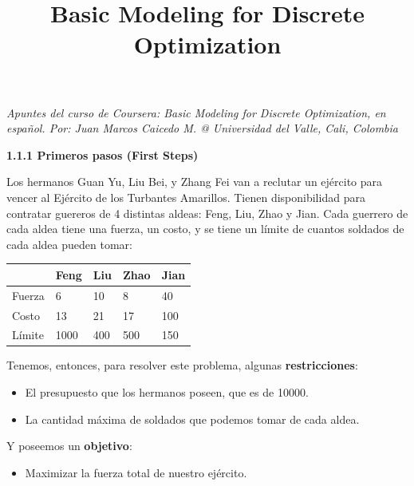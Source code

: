 \documentclass[12pt]{article}
\begin{document}
\title{\textbf{Basic Modeling for Discrete Optimization}}
\date{}
\maketitle

\textit{Apuntes del curso de Coursera: Basic Modeling for Discrete Optimization, en español. Por: Juan Marcos Caicedo M. @ Universidad del Valle, Cali, Colombia}

\vspace{1cm}

\textbf{1.1.1 Primeros pasos (First Steps)}

\begin{justify}
Los hermanos Guan Yu, Liu Bei, y Zhang Fei van a reclutar un ejército para vencer al Ejército  de los Turbantes Amarillos. Tienen disponibilidad para contratar guereros de 4 distintas aldeas: Feng, Liu, Zhao y Jian. Cada guerrero de cada aldea tiene una fuerza, un costo, y se tiene un límite de cuantos soldados de cada aldea pueden tomar:
\end{justify}

\begin{table}[h]
\begin{tabular}{|l|l|l|l|l|}
\hline
       & Feng & Liu & Zhao & Jian \\ \hline
Fuerza & 6    & 10  & 8    & 40   \\ \hline
Costo  & 13   & 21  & 17   & 100  \\ \hline
Límite & 1000 & 400 & 500  & 150  \\ \hline
\end{tabular}
\end{table}

\begin{justify}
Tenemos, entonces, para resolver este problema, algunas \textbf{restricciones}:
\end{justify}

\begin{itemize}
\item El presupuesto que los hermanos poseen, que es de 10000.
\item La cantidad máxima de soldados que podemos tomar de cada aldea.
\end{itemize}

\begin{justify}
Y poseemos un \textbf{objetivo}:
\end{justify}

\begin{itemize}
\item Maximizar la fuerza total de nuestro ejército.
\end{itemize}
\end{document}
